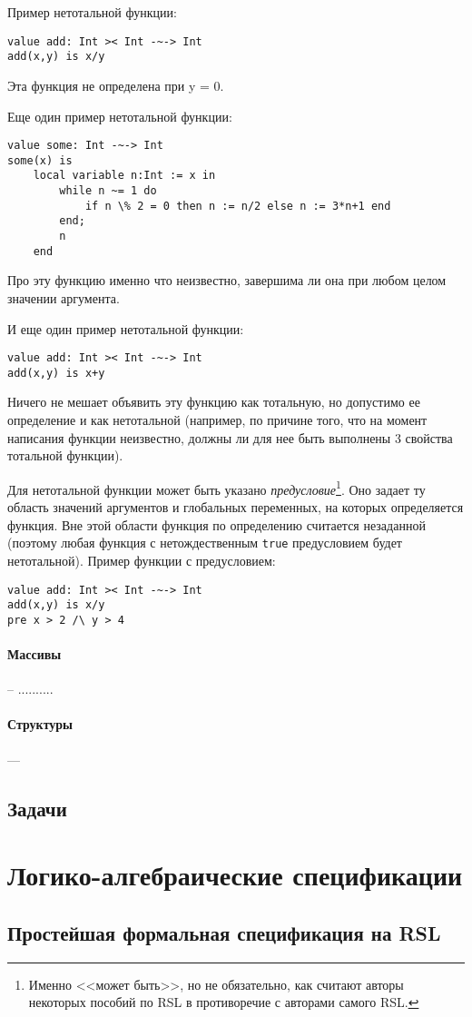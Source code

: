 \documentclass[12pt]{extreport}
\newcommand{\head}[1]{\vspace{1cm}\subsubsection{#1}}
\begin{document}
Пример нетотальной функции:
\begin{lstlisting}
value add: Int >< Int -~-> Int
add(x,y) is x/y
\end{lstlisting}
Эта функция не определена при y = 0.

Еще один пример нетотальной функции:
\begin{lstlisting}
value some: Int -~-> Int
some(x) is
    local variable n:Int := x in
        while n ~= 1 do
            if n \% 2 = 0 then n := n/2 else n := 3*n+1 end
        end;
        n
    end
\end{lstlisting}
Про эту функцию именно что неизвестно, завершима ли она при любом целом значении аргумента.

И еще один пример нетотальной функции:
\begin{lstlisting}
value add: Int >< Int -~-> Int
add(x,y) is x+y
\end{lstlisting}
Ничего не мешает объявить эту функцию как тотальную, но допустимо ее определение и как нетотальной (например, по причине того, что на момент написания функции неизвестно, должны ли для нее быть выполнены 3 свойства тотальной функции).

Для нетотальной функции может быть указано \emph{предусловие}\footnote{Именно <<может быть>>, но не обязательно, как считают авторы некоторых пособий по RSL в противоречие с авторами самого RSL.}. Оно задает ту область значений аргументов и глобальных переменных, на которых определяется функция. Вне этой области функция по определению считается незаданной (поэтому любая функция с нетождественным \texttt{true} предусловием будет нетотальной). Пример функции с предусловием:
\begin{lstlisting}
value add: Int >< Int -~-> Int
add(x,y) is x/y
pre x > 2 /\ y > 4
\end{lstlisting}


\head{Массивы} -- ..........

\head{Структуры} ---

\section*{Задачи}


\chapter{Логико-алгебраические спецификации}

\section{Простейшая формальная спецификация на RSL}
\end{document}
